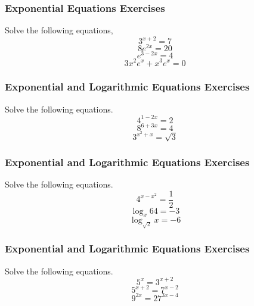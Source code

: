 \documentclass[xcolor=dvipsnames]{beamer}
\begin{document}
\begin{frame}
  \frametitle{Exponential Equations Exercises}
{\ubung} Solve the following equations,
\begin{equation}
  \label{eq:faeyeije}
  3^{x+2}=7
\end{equation}
\begin{equation}
  \label{eq:ochedoxi}
  8e^{2x}=20
\end{equation}
\begin{equation}
  \label{eq:veipoeyu}
  e^{3-2x}=4
\end{equation}
\begin{equation}
  \label{eq:aquusahm}
  3x^{2}e^{x}+x^{3}e^{x}=0
\end{equation}
\end{frame}

\begin{frame}
  \frametitle{Exponential and Logarithmic Equations Exercises}
  {\ubung} Solve the following equations.
  \begin{equation}
    \label{eq:rohkiine}
    4^{1-2x}=2
  \end{equation}
  \begin{equation}
    \label{eq:zahsuini}
    8^{6+3x}=4
  \end{equation}
  \begin{equation}
    \label{eq:iaphaeya}
    3^{x^{2}+x}=\sqrt{3}
  \end{equation}
\end{frame}

\begin{frame}
  \frametitle{Exponential and Logarithmic Equations Exercises}
  {\ubung} Solve the following equations.
  \begin{equation}
    \label{eq:iebaiviu}
    4^{x-x^{2}}=\frac{1}{2}
  \end{equation}
  \begin{equation}
    \label{eq:maareiju}
    \log_{x}64=-3
  \end{equation}
  \begin{equation}
    \label{eq:sheuroov}
    \log_{\sqrt{2}}x=-6
  \end{equation}
\end{frame}

\begin{frame}
  \frametitle{Exponential and Logarithmic Equations Exercises}
  {\ubung} Solve the following equations.
  \begin{equation}
    \label{eq:dairithe}
    5^{x}=3^{x+2}
  \end{equation}
  \begin{equation}
    \label{eq:seizieng}
    5^{x+2}=7^{x-2}
  \end{equation}
  \begin{equation}
    \label{eq:ceivapuw}
    9^{2x}=27^{3x-4}
  \end{equation}
\end{frame}
\end{document}
